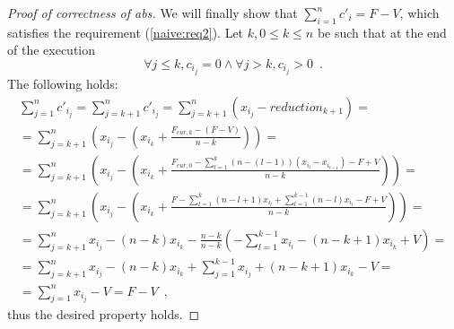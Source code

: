 \begin{proof}[Proof of correctness of abs]
  We will finally show that $\sum\limits_{i=1}^nc'_i = F - V$, which satisfies the requirement (\ref{naive:req2}).
  Let $k, 0 \leq k \leq n$ be such that at the end of the execution
  \begin{equation*}
    \forall j \leq k, c_{i_j} = 0 \wedge \forall j > k, c_{i_j} > 0 \enspace.
  \end{equation*}
  The following holds:
  \begin{equation*}
  \begin{gathered}
    \sum\limits_{j=1}^nc'_{i_j} = \sum\limits_{j=k+1}^nc'_{i_j} = \sum\limits_{j=k+1}^n\left(x_{i_j} -
    reduction_{k+1}\right) = \\
    = \sum\limits_{j=k+1}^n\left(x_{i_j} - \left(x_{i_k} + \frac{F_{cur, k} - \left(F - V\right)}{n - k}\right)\right) = \\
    = \sum\limits_{j=k+1}^n\left(x_{i_j} - \left(x_{i_k} + \frac{F_{cur, 0} - \sum\limits_{l=1}^k\left(n
    - \left(l - 1\right)\right)\left(x_{i_l} - x_{i_{l-1}}\right) - F + V}{n - k}\right)\right) = \\
    = \sum\limits_{j=k+1}^n\left(x_{i_j} - \left(x_{i_k} + \frac{F - \sum\limits_{l=1}^k\left(n - l + 1\right)x_{i_l} +
    \sum\limits_{l=1}^{k-1}\left(n - l\right)x_{i_l} - F + V}{n - k}\right)\right) = \\
    = \sum\limits_{j=k+1}^nx_{i_j} - \left(n - k\right)x_{i_k} - \frac{n - k}{n - k}\left(-\sum\limits_{l=1}^{k-1}x_{i_l} -
    \left(n - k + 1\right)x_{i_k} + V\right) = \\
    = \sum\limits_{j=k+1}^nx_{i_j} - \left(n - k\right)x_{i_k} + \sum\limits_{j=1}^{k-1}x_{i_j} +
    \left(n - k + 1\right)x_{i_k} - V = \\
    = \sum\limits_{j=1}^nx_{i_j} - V = F - V \enspace,
  \end{gathered}
  \end{equation*}
  thus the desired property holds.
\end{proof}

